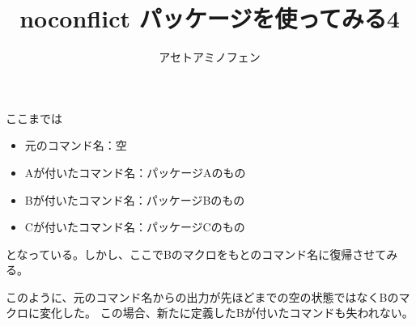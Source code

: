 \documentclass{jsarticle}
\title{\textsf{noconflict} パッケージを使ってみる4}
\author{アセトアミノフェン}
\begin{document}
\maketitle





ここまでは
\begin{itemize}
\item 元のコマンド名：空
\item Aが付いたコマンド名：パッケージAのもの
\item Bが付いたコマンド名：パッケージBのもの
\item Cが付いたコマンド名：パッケージCのもの
\end{itemize}
となっている。しかし、ここでBのマクロをもとのコマンド名に復帰させてみる。






このように、元のコマンド名からの出力が先ほどまでの空の状態ではなくBのマクロに変化した。
この場合、新たに定義したBが付いたコマンドも失われない。
\end{document}
